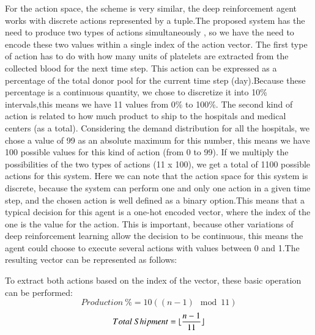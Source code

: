 \documentclass{elsarticle}
\DeclarePairedDelimiter\floor{\lfloor}{\rfloor}
\begin{document}
	For the action space, the scheme is very similar, the deep reinforcement agent works with discrete actions represented by a tuple.The proposed system has the need to produce two types of actions simultaneously , so we have the need to encode these two values within a single index of the action vector.
	The first type of action has to do with how many units of platelets are extracted from the collected blood for the next time step. This action can be expressed as a percentage of the total donor pool for the current time step (day).Because these percentage is a continuous quantity, we chose to discretize it into 10\% intervals,this means we have 11 values from 0\% to 100\%.
	The second kind of action is related to how much product to ship to the hospitals and medical centers (as a total). Considering the demand distribution for all the hospitals, we chose a value of 99 as an absolute maximum for this number, this means we have 100 possible values for this kind of action (from 0 to 99). If we multiply the possibilities of the two types of actions (11 x 100), we get a total of 1100 possible actions for this system. Here we can note that the action space for this system is discrete, because the system can perform one and only one action in a given time step, and the chosen action is well defined as a binary option.This means that a typical decision for this agent is a one-hot encoded vector, where the index of the one is the value for the action. This is important, because other variations of deep reinforcement learning allow the decision to be continuous, this means the agent could choose to execute several actions with values between 0 and 1.The resulting vector can be represented as follows:
	
		\begin{center}
	\end{center}

	To extract both actions based on the index of the vector, these basic operation can be performed:
	\[ Production\ \% = 10({{(n-1)}\mod11}) \]
	\[ Total\ Shipment = \floor{\frac{n-1}{11}}\]
	
\end{document}
